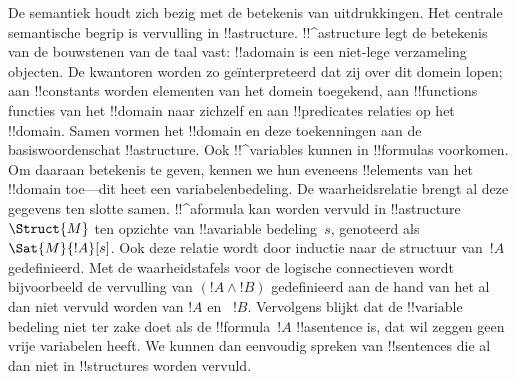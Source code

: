 \documentclass[openany]{memoir}
\begin{document}
\endgroup

\begingroup
\def\olfilename{OLP-0160}
\def\olfilepath{content/first-order-logic/syntax-and-semantics/}
\hypertarget{unit-OLP-0160}{}





De semantiek houdt zich bezig met de betekenis van uitdrukkingen. Het
centrale semantische begrip is vervulling in !!a{structure}.
!!^a{structure} legt de betekenis van de bouwstenen van de taal vast:
!!a{domain} is een niet-lege verzameling objecten. De kwantoren worden
zo geïnterpreteerd dat zij over dit domein lopen; aan !!{constant}s
worden elementen van het domein toegekend, aan !!{function}s functies
van het !!{domain} naar zichzelf en aan !!{predicate}s relaties op het
!!{domain}. Samen vormen het !!{domain} en deze toekenningen aan de
basiswoordenschat !!a{structure}. Ook !!^{variable}s kunnen in
!!{formula}s voorkomen. Om daaraan betekenis te geven, kennen we hun
eveneens !!{element}s van het !!{domain} toe---dit heet een
variabelenbedeling. De waarheidsrelatie brengt al deze gegevens ten
slotte samen. !!^a{formula} kan worden vervuld in
!!a{structure}~$\Struct{M}$ ten opzichte van !!a{variable} bedeling~$s$,
genoteerd als $\Sat{M}{!A}[s]$. Ook deze relatie wordt door inductie
naar de structuur van~$!A$ gedefinieerd. Met de waarheidstafels voor
de logische connectieven wordt bijvoorbeeld de vervulling van
$(!A \land !B)$ gedefinieerd aan de hand van het al dan niet vervuld
worden van $!A$ en ~$!B$. Vervolgens blijkt dat de !!{variable}
bedeling niet ter zake doet als de !!{formula}~$!A$ !!a{sentence} is,
dat wil zeggen geen vrije variabelen heeft. We kunnen dan eenvoudig
spreken van !!{sentence}s die al dan niet in !!{structure}s worden
vervuld.
\end{document}
